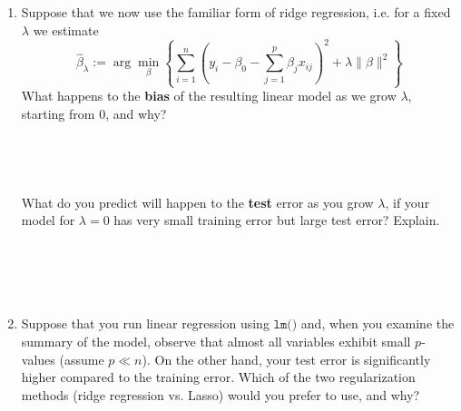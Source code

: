 \documentclass{article}
\begin{document}
\begin{enumerate}
\item Suppose that we now use the familiar form of ridge regression, i.e. for
a fixed $\lambda$ we estimate
\begin{equation}
    \hat{\beta}_{\lambda} :=
    \arg\min_{\beta} \left\{
        \sum_{i = 1}^n \left(y_i - \beta_0 - \sum_{j=1}^p \beta_j
        x_{ij}\right)^2 + \lambda \| \beta \|^2
    \right\}
    \label{eq:ridge-prob}
\end{equation}
What happens to the \textbf{bias} of the resulting linear model as we grow
$\lambda$, starting from $0$, and why?
\begin{Verbatim}[frame=single]




\end{Verbatim}
What do you predict will happen to the \textbf{test} error as you grow
$\lambda$, if your model for $\lambda = 0$ has very small training error but
large test error? Explain.
\begin{Verbatim}[frame=single]





\end{Verbatim}

\item Suppose that you run linear regression using $\texttt{lm()}$ and, when
you examine the summary of the model, observe that almost all variables exhibit
small $p$-values (assume $p \ll n$). On the other hand, your test error is
significantly higher compared to the training error. Which of the two
regularization methods (ridge regression vs. Lasso) would you prefer to use,
and why?
\begin{Verbatim}[frame=single]





\end{Verbatim}


\end{enumerate}
\end{document}

